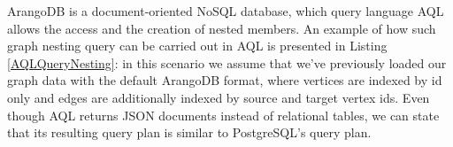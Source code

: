 ArangoDB is a document-oriented NoSQL database, which query language AQL allows the access and the creation of nested members. An example of how such graph nesting query can be carried out in AQL is presented in Listing \ref{AQLQueryNesting}: in this scenario we assume that we've previously loaded our graph data with the default ArangoDB format, where  vertices are indexed by id only and edges are additionally indexed by source and target vertex ids. Even though AQL returns JSON documents instead of relational tables, we can state that its resulting query plan is similar to PostgreSQL's query plan.
%
%
%
%
%
%
%

